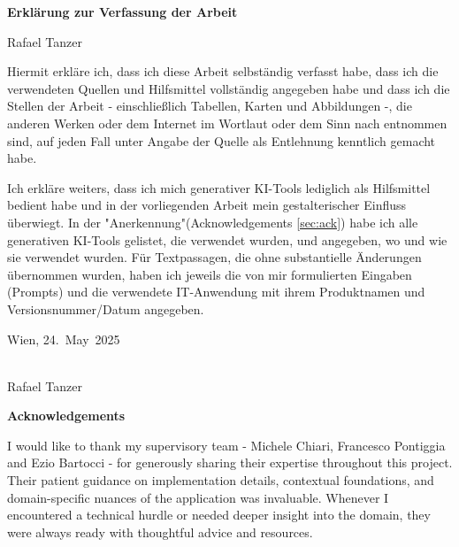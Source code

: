 \documentclass[11pt]{report}
\newcommand{\authorname}{Rafael Tanzer}
\newcommand{\submissionmonth}{May}
\newcommand{\submissionyear}{2025}
\newcommand{\submissionday}{24}
\begin{document}
\thispagestyle{empty}
\begin{flushright}
  {\LARGE\bfseries Erklärung zur Verfassung der Arbeit\par}
\end{flushright}

\vspace{4cm}
\noindent
{\large \authorname}

\vspace{2cm}

\noindent
Hiermit erkläre ich, dass ich diese Arbeit selbständig verfasst habe, dass ich die verwendeten Quellen und Hilfsmittel vollständig angegeben habe und dass ich die Stellen der Arbeit - einschließlich Tabellen, Karten und Abbildungen -, die anderen Werken oder dem Internet im Wortlaut oder dem Sinn nach entnommen sind, auf jeden Fall unter Angabe der Quelle als Entlehnung kenntlich gemacht habe.

\medskip

\noindent
Ich erkläre weiters, dass ich mich generativer KI-Tools lediglich als Hilfsmittel bedient habe und in der vorliegenden Arbeit mein gestalterischer Einfluss überwiegt. In der "Anerkennung"(Acknowledgements \ref{sec:ack}) habe ich alle generativen KI-Tools gelistet, die verwendet wurden, und angegeben, wo und wie sie verwendet wurden. Für Textpassagen, die ohne substantielle Änderungen übernommen wurden, haben ich jeweils die von mir formulierten Eingaben (Prompts) und die verwendete IT-Anwendung mit ihrem Produktnamen und Versionsnummer/Datum angegeben.

\vfill

\noindent
\begin{minipage}[t]{0.5\textwidth}
  Wien, \submissionday.~\submissionmonth~\submissionyear
\end{minipage}%
\hfill
\begin{minipage}[t]{0.4\textwidth}
  \hrulefill\\
  \centering \authorname
\end{minipage}

\clearpage
\thispagestyle{empty}
\begin{flushright}
  {\LARGE\bfseries Acknowledgements\par}
\end{flushright}
\vspace{5cm}

\noindent I would like to thank my supervisory team - Michele Chiari, Francesco Pontiggia and Ezio Bartocci - for generously sharing their expertise throughout this project.
Their patient guidance on implementation details, contextual foundations, and domain-specific nuances of the application was invaluable. Whenever I encountered a technical
hurdle or needed deeper insight into the domain, they were always ready with thoughtful advice and resources.
\vspace{1ex}
\end{document}
